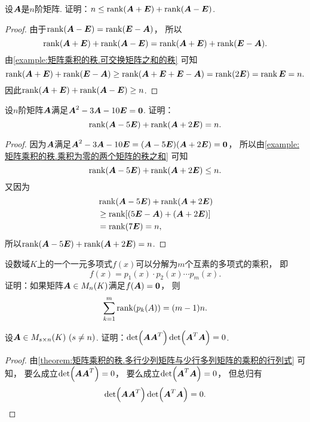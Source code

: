 \begin{example}\label{example:矩阵乘积的秩.矩阵的一次多项式的秩之和}
设\(\boldsymbol{A}\)是\(n\)阶矩阵.
证明：\(n \leq \rank(\boldsymbol{A} + \boldsymbol{E}) + \rank(\boldsymbol{A} - \boldsymbol{E})\).
\begin{proof}
由于\(\rank(\boldsymbol{A} - \boldsymbol{E}) = \rank(\boldsymbol{E} - \boldsymbol{A})\)，
所以\[
	\rank(\boldsymbol{A} + \boldsymbol{E}) + \rank(\boldsymbol{A} - \boldsymbol{E})
	= \rank(\boldsymbol{A} + \boldsymbol{E}) + \rank(\boldsymbol{E} - \boldsymbol{A}).
\]
由\cref{example:矩阵乘积的秩.可交换矩阵之和的秩} 可知\[
	\rank(\boldsymbol{A} + \boldsymbol{E}) + \rank(\boldsymbol{E} - \boldsymbol{A})
	\geq \rank(\boldsymbol{A} + \boldsymbol{E} + \boldsymbol{E} - \boldsymbol{A})
	= \rank(2\boldsymbol{E})
	= \rank\boldsymbol{E}
	= n.
\]
因此\(\rank(\boldsymbol{A} + \boldsymbol{E}) + \rank(\boldsymbol{A} - \boldsymbol{E}) \geq n\).
\end{proof}
\end{example}
\begin{example}\label{example:矩阵乘积的秩.矩阵的多项式的各个互素因式的秩之和}
设\(n\)阶矩阵\(\boldsymbol{A}\)满足\(\boldsymbol{A}^2 - 3 \boldsymbol{A} - 10 \boldsymbol{E} = \boldsymbol0\).
证明：\[
	\rank(\boldsymbol{A} - 5\boldsymbol{E}) + \rank(\boldsymbol{A} + 2\boldsymbol{E}) = n.
\]
\begin{proof}
因为\(\boldsymbol{A}\)满足\(\boldsymbol{A}^2 - 3 \boldsymbol{A} - 10 \boldsymbol{E} = (\boldsymbol{A} - 5\boldsymbol{E})(\boldsymbol{A} + 2\boldsymbol{E}) = \boldsymbol0\)，
所以由\cref{example:矩阵乘积的秩.乘积为零的两个矩阵的秩之和} 可知\[
	\rank(\boldsymbol{A} - 5\boldsymbol{E}) + \rank(\boldsymbol{A} + 2\boldsymbol{E}) \leq n.
\]
又因为\begin{align*}
	&\rank(\boldsymbol{A} - 5\boldsymbol{E}) + \rank(\boldsymbol{A} + 2\boldsymbol{E}) \\
	&\geq \rank[(5\boldsymbol{E} - \boldsymbol{A}) + (\boldsymbol{A} + 2\boldsymbol{E})] \\
	&= \rank(7\boldsymbol{E})
	= n,
\end{align*}
所以\(\rank(\boldsymbol{A} - 5\boldsymbol{E}) + \rank(\boldsymbol{A} + 2\boldsymbol{E}) = n\).
\end{proof}
\end{example}
\begin{example}
设数域\(K\)上的一个一元多项式\(f(x)\)可以分解为\(m\)个互素的多项式的乘积，
即\[
	f(x) = p_1(x) \cdot p_2(x) \dotsm p_m(x).
\]
证明：如果矩阵\(\boldsymbol{A} \in M_n(K)\)满足\(f(\boldsymbol{A}) = \boldsymbol0\)，
则\[
	\sum_{k=1}^m \rank(p_k(A))
	= (m-1)n.
\]
\end{example}

\begin{example}
设\(\boldsymbol{A} \in M_{s \times n}(K)\ (s \neq n)\).
证明：\(\det(\boldsymbol{A} \boldsymbol{A}^T) \det(\boldsymbol{A}^T \boldsymbol{A}) = 0\).
\begin{proof}
由\cref{theorem:矩阵乘积的秩.多行少列矩阵与少行多列矩阵的乘积的行列式} 可知，
要么成立\(\det(\boldsymbol{A} \boldsymbol{A}^T) = 0\)，
要么成立\(\det(\boldsymbol{A}^T \boldsymbol{A}) = 0\)，
但总归有\[
	\det(\boldsymbol{A} \boldsymbol{A}^T) \det(\boldsymbol{A}^T \boldsymbol{A}) = 0.
	\qedhere
\]
\end{proof}
\end{example}

